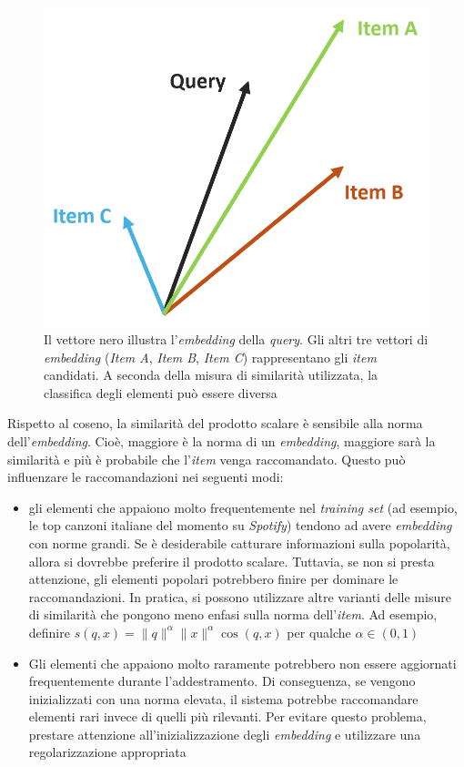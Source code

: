 \begin{figure}[H]
    \centering
    \includegraphics[scale=0.8]{figures/embedding.PNG}
    \caption{Il vettore nero illustra l'\textit{embedding} della \textit{query}. Gli altri tre vettori di \textit{embedding} (\textit{Item A}, \textit{Item B}, \textit{Item C}) rappresentano gli \textit{item} candidati. A seconda della misura di similarità utilizzata, la classifica degli elementi può essere diversa}
    \label{fig:embedding}
\end{figure}

Rispetto al coseno, la similarità del prodotto scalare è sensibile alla norma dell'\textit{embedding}. Cioè, maggiore è la norma di un \textit{embedding}, maggiore sarà la similarità e più è probabile che l'\textit{item} venga raccomandato. Questo può influenzare le raccomandazioni nei seguenti modi:

\begin{itemize}
    \item gli elementi che appaiono molto frequentemente nel \textit{training set} (ad esempio, le top canzoni italiane del momento su \textit{Spotify}) tendono ad avere \textit{embedding} con norme grandi. Se è desiderabile catturare informazioni sulla popolarità, allora si dovrebbe preferire il prodotto scalare. Tuttavia, se non si presta attenzione, gli elementi popolari potrebbero finire per dominare le raccomandazioni. In pratica, si possono utilizzare altre varianti delle misure di similarità che pongono meno enfasi sulla norma dell'\textit{item}. Ad esempio, definire $s(q, x) = \|q\|^{\alpha} \|x\|^{\alpha} \cos(q, x)$ per qualche $\alpha \in (0,1)$
    \item Gli elementi che appaiono molto raramente potrebbero non essere aggiornati frequentemente durante l'addestramento. Di conseguenza, se vengono inizializzati con una norma elevata, il sistema potrebbe raccomandare elementi rari invece di quelli più rilevanti. Per evitare questo problema, prestare attenzione all'inizializzazione degli \textit{embedding} e utilizzare una regolarizzazione appropriata
\end{itemize}


